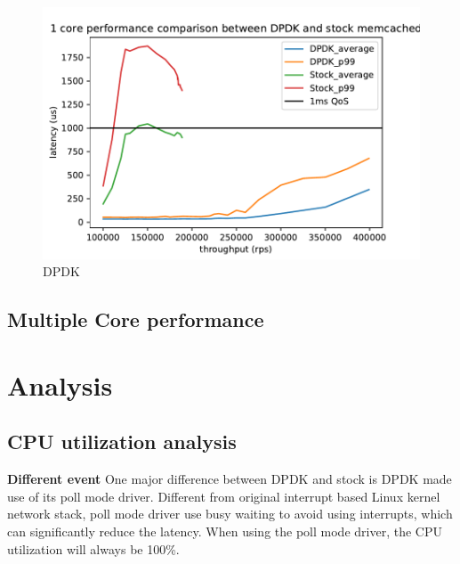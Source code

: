 \documentclass[bsc,frontabs,twoside,singlespacing,parskip,deptreport]{infthesis}     %
\begin{document}
\begin{figure}[h]

	\includegraphics{figure/dpdk_1.pdf}
	\caption{DPDK}
	\label{fig:dpdk_1}
\end{figure}

\subsection{Multiple Core performance}

\section{Analysis}

\subsection{CPU utilization analysis}

\textbf{Different event}
One major difference between DPDK and stock is DPDK made use of its poll mode driver. Different from original interrupt based Linux kernel network stack, poll mode driver use busy waiting to avoid using interrupts, which can significantly reduce the latency. When using the poll mode driver, the CPU utilization will always be 100\%. 
\end{document}
